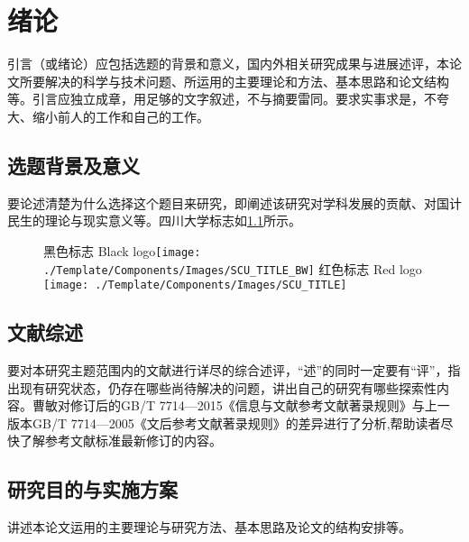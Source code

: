 
\chapter{绪论}%
引言（或绪论）应包括选题的背景和意义，国内外相关研究成果与进展述评，本论文所要解决的科学与技术问题、所运用的主要理论和方法、基本思路和论文结构等。引言应独立成章，用足够的文字叙述，不与摘要雷同。要求实事求是，不夸大、缩小前人的工作和自己的工作。
\section{选题背景及意义}
要论述清楚为什么选择这个题目来研究，即阐述该研究对学科发展的贡献、对国计民生的理论与现实意义等。四川大学标志如\cref{fig:test}所示。
\begin{figure}[!htb]
    \centering
    \bisubcaptionbox
    {黑色标志\label{fig:test:A}}
    {Black logo}{\texttt{[image: ./Template/Components/Images/SCU\_TITLE\_BW]}}%
    \qquad
    \bisubcaptionbox
    {红色标志\label{fig:test:B}}
    {Red logo}{ \texttt{[image: ./Template/Components/Images/SCU\_TITLE]}}%
    \label{fig:test}
    \end{figure}
\section{文献综述}
要对本研究主题范围内的文献进行详尽的综合述评，“述”的同时一定要有“评”，指出现有研究状态，仍存在哪些尚待解决的问题，讲出自己的研究有哪些探索性内容。曹敏\cite{曹敏GB,陈浩元2015gb}对修订后的GB/T 7714—2015《信息与文献参考文献著录规则》与上一版本GB/T 7714—2005《文后参考文献著录规则》的差异进行了分析,帮助读者尽快了解参考文献标准最新修订的内容。
\section{研究目的与实施方案}
讲述本论文运用的主要理论与研究方法、基本思路及论文的结构安排等。

